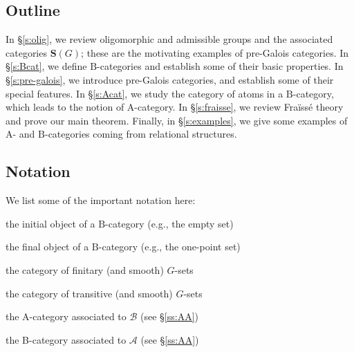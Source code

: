 \documentclass[12pt]{amsart}
\numberwithin{equation}{section}
\theoremstyle{definition}
\newcommand{\cA}{\mathcal{A}}
\newcommand{\rA}{\mathrm{A}}
\newcommand{\cB}{\mathcal{B}}
\newcommand{\rB}{\mathrm{B}}
\newcommand{\cC}{\mathcal{C}}
\newcommand{\bS}{\mathbf{S}}
\newcommand{\fS}{\mathfrak{S}}
\newcommand{\bT}{\mathbf{T}}
\newcommand{\defn}[1]{\emph{#1}}
\renewcommand{\AA}{\mathbb{A}}
\newcommand{\BB}{\mathbb{B}}
\newcommand{\bzero}{\mathbf{0}}
\newcommand{\bone}{\mathbf{1}}
\newcommand{\myuline}[1]{%
  \uline{\phantom{#1}}%
  \llap{\contour{white}{#1}}%
}
\DeclareMathOperator{\uRep}{\text{\myuline{\rm Rep}}}
\begin{document}
%

\subsection{Outline}

In \S \ref{s:olig}, we review oligomorphic and admissible groups and the associated categories $\bS(G)$; these are the motivating examples of pre-Galois categories. In \S \ref{s:Bcat}, we define $\rB$-categories and establish some of their basic properties. In \S \ref{s:pre-galois}, we introduce pre-Galois categories, and establish some of their special features. In \S \ref{s:Acat}, we study the category of atoms in a $\rB$-category, which leads to the notion of $\rA$-category. In \S \ref{s:fraisse}, we review Fra\"iss\'e theory and prove our main theorem. Finally, in \S \ref{s:examples}, we give some examples of $\rA$- and $\rB$-categories coming from relational structures.

\subsection{Notation}

We list some of the important notation here:
\begin{description}[align=right,labelwidth=2.5cm,leftmargin=!]
\item[ $\bzero$ ] the initial object of a $\rB$-category (e.g., the empty set)
\item[ $\bone$ ] the final object of a $\rB$-category (e.g., the one-point set)
\item[ $\bS(G)$ ] the category of finitary (and smooth) $G$-sets
\item[ $\bT(G)$ ] the category of transitive (and smooth) $G$-sets
\item[ $\AA(\cB)$ ] the A-category associated to $\cB$ (see \S \ref{ss:AA})
\item[ $\BB(\cA)$ ] the B-category associated to $\cA$ (see \S \ref{ss:AA})
\end{description}
\end{document}
